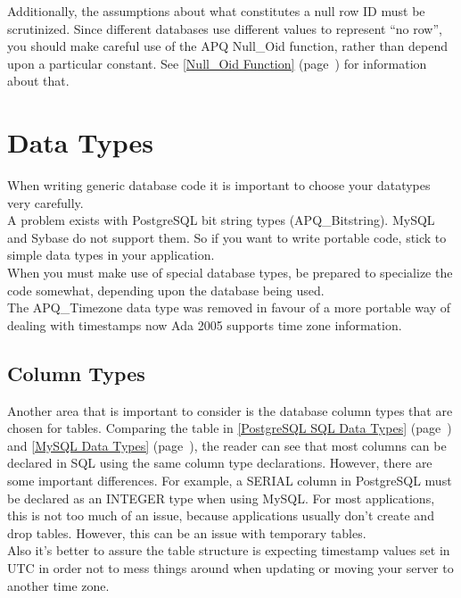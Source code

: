 \documentclass[english,letterpaper]{book}
\newcommand\Ref[1]{\textsection\ref{#1} (page~\pageref{#1})}
\begin{document}
Additionally, the assumptions about what constitutes a null row ID
must be scrutinized. Since different databases use different values
to represent ``no row'', you should make careful use of the APQ
Null\_Oid function, rather than depend upon a particular
constant. See \Ref{Null_Oid Function} for information about
that.


\section{Data Types}

When writing generic database code it is important to choose your
datatypes very carefully.\\

A problem exists with PostgreSQL bit string types (APQ\_Bitstring).
MySQL and Sybase do not support them. So if you want to write portable
code, stick to simple data types in your application. \\

When you must make use of special database types, be prepared to specialize
the code somewhat, depending upon the database being used.\\


The APQ\_Timezone data type was removed in favour of a more portable way of dealing
with timestamps now Ada 2005 supports time zone information.


\subsection{Column Types}

Another area that is important to consider is the database column
 types that are chosen for tables. Comparing the table in
\Ref{PostgreSQL SQL Data Types} and \Ref{MySQL Data Types}, the
reader can see that most columns can be declared in SQL using the
same column type declarations. However, there are some important differences.
For example, a SERIAL column in PostgreSQL must be declared as an
INTEGER type when using MySQL. For most applications, this is not
too much of an issue, because applications usually don't create and
drop tables. However, this can be an issue with temporary tables.\\


Also it's better to assure the table structure is expecting timestamp values
set in UTC in order not to mess things around when updating or moving your
server to another time zone.\\
\end{document}
